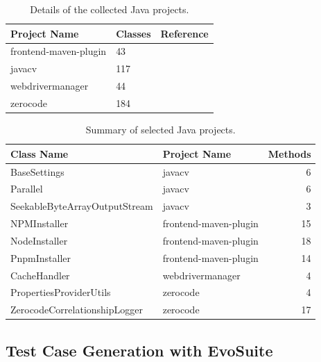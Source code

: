 \begin{table}
    \centering
    \begin{tabular}{l | l | r}
        \textbf{Project Name} & \textbf{Classes} & \textbf{Reference} \\
        \hline
        frontend-maven-plugin & 43 & \cite{sletteberg_frontend-maven-plugin_2023} \\
        javacv & 117 & \cite{noauthor_bytedecojavacv_nodate} \\
        webdrivermanager & 44 & \cite{noauthor_bonigarciawebdrivermanager_nodate} \\
        zerocode & 184 & \cite{noauthor_authorjappszerocode_nodate} \\
    \end{tabular}
\caption{Details of the collected Java projects.}
\label{tab:collected_java_projects}
\end{table}

\begin{table}
    \centering    
    \begin{tabular}{l | l | r}
        \textbf{Class Name} & \textbf{Project Name} & \textbf{Methods} \\
        \hline
        BaseSettings & javacv & 6 \\
        Parallel & javacv & 6 \\
        SeekableByteArrayOutputStream & javacv & 3 \\
        NPMInstaller & frontend-maven-plugin & 15 \\
        NodeInstaller & frontend-maven-plugin & 18 \\
        PnpmInstaller & frontend-maven-plugin & 14 \\
        CacheHandler & webdrivermanager & 4 \\
        PropertiesProviderUtils & zerocode & 4 \\
        ZerocodeCorrelationshipLogger & zerocode & 17 \\
    \end{tabular}
\caption{Summary of selected Java projects.}
\label{tab:selected_java_projects}
\end{table}

\vspace{0.1 cm}
\subsection{Test Case Generation with EvoSuite}
\label{sec:test_case_generation}
\vspace{0.1 cm}

